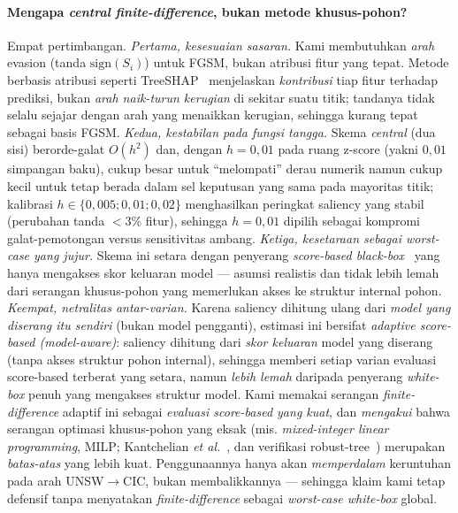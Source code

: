 \documentclass[11pt,a4paper]{article}
\begin{document}
\paragraph{Mengapa \emph{central finite-difference}, bukan metode khusus-pohon?}
Empat pertimbangan. \emph{Pertama, kesesuaian sasaran.} Kami membutuhkan
\emph{arah} evasion (tanda $\mathrm{sign}(S_i)$) untuk FGSM, bukan atribusi fitur
yang tepat. Metode berbasis atribusi seperti TreeSHAP~\cite{lundberg2020treeshap}
menjelaskan \emph{kontribusi} tiap fitur terhadap prediksi, bukan \emph{arah
naik-turun kerugian} di sekitar suatu titik; tandanya tidak selalu sejajar dengan
arah yang menaikkan kerugian, sehingga kurang tepat sebagai basis FGSM.
\emph{Kedua, kestabilan pada fungsi tangga.} Skema \emph{central} (dua sisi)
berorde-galat $O(h^2)$ dan, dengan $h=0{,}01$ pada ruang z-score (yakni $0{,}01$
simpangan baku), cukup besar untuk ``melompati'' derau numerik namun cukup kecil
untuk tetap berada dalam sel keputusan yang sama pada mayoritas titik; kalibrasi
$h \in \{0{,}005; 0{,}01; 0{,}02\}$ menghasilkan peringkat saliency yang stabil
(perubahan tanda $<3\%$ fitur), sehingga $h=0{,}01$ dipilih sebagai kompromi
galat-pemotongan versus sensitivitas ambang. \emph{Ketiga, kesetaraan sebagai
\emph{worst-case} yang jujur.} Skema ini setara dengan penyerang \emph{score-based
black-box}~\cite{ilyas2018blackbox} yang hanya mengakses skor keluaran model ---
asumsi realistis dan tidak lebih lemah dari serangan khusus-pohon yang memerlukan
akses ke struktur internal pohon. \emph{Keempat, netralitas antar-varian.} Karena
saliency dihitung ulang dari \emph{model yang diserang itu sendiri} (bukan model
pengganti), estimasi ini bersifat \emph{adaptive score-based (model-aware)}: saliency
dihitung dari \emph{skor keluaran} model yang diserang (tanpa akses struktur pohon
internal), sehingga memberi setiap varian evaluasi score-based terberat yang setara,
namun \emph{lebih lemah} daripada penyerang \emph{white-box} penuh yang mengakses
struktur model. Kami memakai serangan \emph{finite-difference} adaptif ini sebagai
\emph{evaluasi score-based yang kuat}, dan \emph{mengakui} bahwa serangan optimasi
khusus-pohon yang eksak (mis. \emph{mixed-integer linear programming}, MILP;
Kantchelian \emph{et al.}~\cite{kantchelian2016}, dan verifikasi robust-tree~\cite{chen2019robusttrees})
merupakan \emph{batas-atas} yang lebih kuat. Penggunaannya hanya akan
\emph{memperdalam} keruntuhan pada arah UNSW$\rightarrow$CIC, bukan membalikkannya ---
sehingga klaim kami tetap defensif tanpa menyatakan \emph{finite-difference} sebagai
\emph{worst-case white-box} global.
\end{document}
